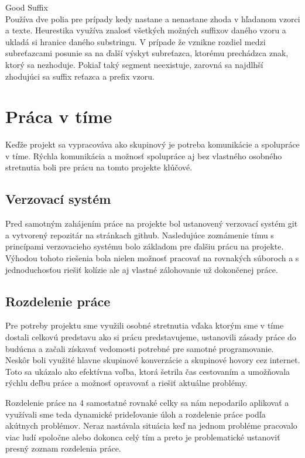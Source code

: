 \documentclass[a4paper]{article}
\begin{document}
Good Suffix\\
Používa dve polia pre prípady kedy nastane a nenastane zhoda v hľadanom vzorci a texte. Heurestika využíva znalosť všetkých možných suffixov daného vzoru a ukladá si hranice daného substringu. V prípade že vznikne rozdiel medzi subreťazcami posunie sa na ďalší výskyt subreťazca, ktorému prechádzca znak, ktorý sa nezhoduje. Pokiaľ taký segment neexistuje, zarovná sa najdlhší zhodujúci sa suffix reťazca a prefix vzoru.

\section{Práca v tíme}
Keďže projekt sa vypracováva ako skupinový je potreba komunikácie a spolupráce v tíme. Rýchla komunikácia a možnosť spolupráce aj bez vlastného osobného stretnutia boli pre prácu na tomto projekte klúčové.

\subsection{Verzovací systém}
Pred samotným zahájením práce na projekte bol ustanovený verzovací systém git a vytvorený repozitár na stránkach github. Nasledujúce zoznámenie tímu s princípami verzovacieho systému bolo základom pre ďalšiu prácu na projekte. Výhodou tohoto riešenia bola nielen možnosť pracovať na rovnakých súboroch a s jednoduchosťou riešiť kolízie ale aj vlastné zálohovanie už dokončenej práce.
 
\subsection{Rozdelenie práce}
Pre potreby projektu sme využili osobné stretnutia vďaka ktorým sme v tíme dostali celkovú predstavu ako si prácu predstavujeme, ustanovili zásady práce do budúcna a začali získavať vedomosti potrebné pre samotné programovanie. Neskôr boli využité hlavne skupinové konverzácie a skupinové hovory cez internet. Toto sa ukázalo ako efektívna voľba, ktorá šetrila čas cestovaním a umožňovala rýchlu deľbu práce a možnosť opravovať a riešiť aktuálne problémy.

Rozdelenie práce na 4 samostatné rovnaké celky sa nám nepodarilo aplikovať a využívali sme teda dynamické prideľovanie úloh a rozdelenie práce podľa akútnych problémov. Neraz nastávala situácia keď na jednom probléme pracovalo viac ludí spoločne alebo dokonca celý tím a preto je problematické ustanoviť presný zoznam rozdelenia práce.
\end{document}

